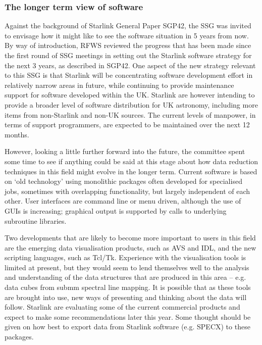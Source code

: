\subsubsection{The longer term view of software}

Against the background of Starlink General Paper SGP42, the SSG was
invited to envisage how it might like to see the software situation in
5 years from now. By way of introduction, RFWS reviewed the progress
that has been made since the first round of SSG meetings in setting
out the Starlink software strategy for the next 3 years, as described
in SGP42. One aspect of the new strategy relevant to this SSG is that
Starlink will be concentrating software development effort in
relatively narrow areas in future, while continuing to provide
maintenance support for software developed within the UK. Starlink are
however intending to provide a broader level of software distribution
for UK astronomy, including more items from non-Starlink and non-UK
sources. The current levels of manpower, in terms of support
programmers, are expected to be maintained over the next 12 months.

However, looking a little further forward into the future, the
committee spent some time to see if anything could be said at this
stage about how data reduction techniques in this field might evolve
in the longer term. Current software is based on `old technology'
using monolithic packages often developed for specialised jobs,
sometimes with overlapping functionality, but largely independent of
each other. User interfaces are command line or menu driven, although
the use of GUIs is increasing; graphical output is supported by calls
to underlying subroutine libraries.

Two developments that are likely to become more important to users in
this field are the emerging data visualisation products, such as AVS
and IDL, and the new scripting languages, such as Tcl/Tk.  Experience
with the visualisation tools is limited at present, but they would
seem to lend themselves well to the analysis and understanding of the
data structures that are produced in this area -- e.g. data cubes from
submm spectral line mapping. It is possible that as these tools are
brought into use, new ways of presenting and thinking about the data
will follow.  Starlink are evaluating some of the current commercial
products and expect to make some recommendations later this year. Some
thought should be given on how best to export data from Starlink
software (e.g. SPECX) to these packages.

